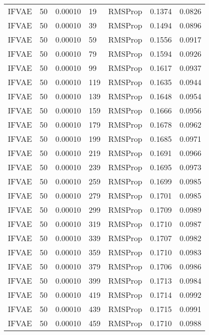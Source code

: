\begin{tabular}{llrllrr}
   IFVAE &   50 &  0.00010 &    19 &   RMSProp &  0.1374 &       0.0826 \\
   IFVAE &   50 &  0.00010 &    39 &   RMSProp &  0.1494 &       0.0896 \\
   IFVAE &   50 &  0.00010 &    59 &   RMSProp &  0.1556 &       0.0917 \\
   IFVAE &   50 &  0.00010 &    79 &   RMSProp &  0.1594 &       0.0926 \\
   IFVAE &   50 &  0.00010 &    99 &   RMSProp &  0.1617 &       0.0937 \\
   IFVAE &   50 &  0.00010 &   119 &   RMSProp &  0.1635 &       0.0944 \\
   IFVAE &   50 &  0.00010 &   139 &   RMSProp &  0.1648 &       0.0954 \\
   IFVAE &   50 &  0.00010 &   159 &   RMSProp &  0.1666 &       0.0956 \\
   IFVAE &   50 &  0.00010 &   179 &   RMSProp &  0.1678 &       0.0962 \\
   IFVAE &   50 &  0.00010 &   199 &   RMSProp &  0.1685 &       0.0971 \\
   IFVAE &   50 &  0.00010 &   219 &   RMSProp &  0.1691 &       0.0966 \\
   IFVAE &   50 &  0.00010 &   239 &   RMSProp &  0.1695 &       0.0973 \\
   IFVAE &   50 &  0.00010 &   259 &   RMSProp &  0.1699 &       0.0985 \\
   IFVAE &   50 &  0.00010 &   279 &   RMSProp &  0.1701 &       0.0985 \\
   IFVAE &   50 &  0.00010 &   299 &   RMSProp &  0.1709 &       0.0989 \\
   IFVAE &   50 &  0.00010 &   319 &   RMSProp &  0.1710 &       0.0987 \\
   IFVAE &   50 &  0.00010 &   339 &   RMSProp &  0.1707 &       0.0982 \\
   IFVAE &   50 &  0.00010 &   359 &   RMSProp &  0.1710 &       0.0983 \\
   IFVAE &   50 &  0.00010 &   379 &   RMSProp &  0.1706 &       0.0986 \\
   IFVAE &   50 &  0.00010 &   399 &   RMSProp &  0.1713 &       0.0984 \\
   IFVAE &   50 &  0.00010 &   419 &   RMSProp &  0.1714 &       0.0992 \\
   IFVAE &   50 &  0.00010 &   439 &   RMSProp &  0.1715 &       0.0991 \\
   IFVAE &   50 &  0.00010 &   459 &   RMSProp &  0.1710 &       0.0988 \\

\end{tabular}
